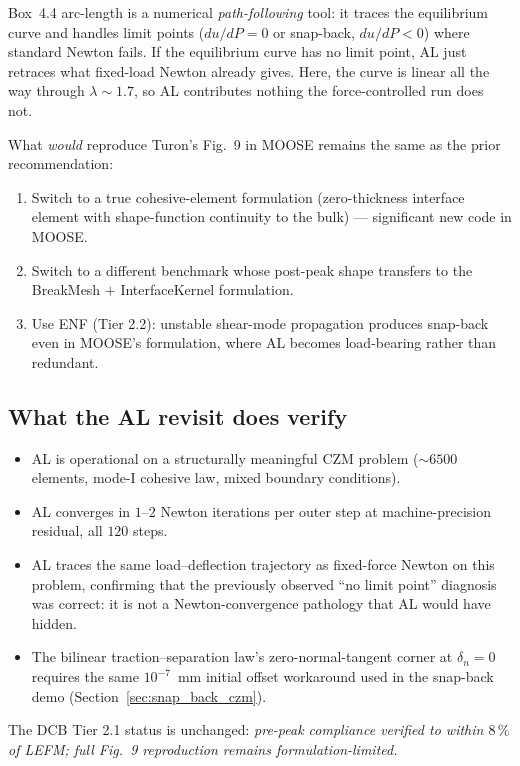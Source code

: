 Box~4.4 arc-length is a numerical \emph{path-following} tool: it traces
the equilibrium curve and handles limit points ($du/dP = 0$ or
snap-back, $du/dP < 0$) where standard Newton fails. If the equilibrium
curve has no limit point, AL just retraces what fixed-load Newton already
gives. Here, the curve is linear all the way through $\lambda \sim 1.7$,
so AL contributes nothing the force-controlled run does not.

What \emph{would} reproduce Turon's Fig.~9 in MOOSE remains the same as
the prior recommendation:
\begin{enumerate}
\item Switch to a true cohesive-element formulation (zero-thickness
      interface element with shape-function continuity to the bulk) —
      significant new code in MOOSE.
\item Switch to a different benchmark whose post-peak shape transfers
      to the BreakMesh $+$ InterfaceKernel formulation.
\item Use ENF (Tier 2.2): unstable shear-mode propagation produces
      snap-back even in MOOSE's formulation, where AL becomes
      load-bearing rather than redundant.
\end{enumerate}

\subsection{What the AL revisit does verify}

\begin{itemize}
\item AL is operational on a structurally meaningful CZM problem
      ($\sim 6500$ elements, mode-I cohesive law, mixed boundary
      conditions).
\item AL converges in $1$--$2$ Newton iterations per outer step at
      machine-precision residual, all $120$ steps.
\item AL traces the same load--deflection trajectory as fixed-force
      Newton on this problem, confirming that the previously observed
      ``no limit point'' diagnosis was correct: it is not a
      Newton-convergence pathology that AL would have hidden.
\item The bilinear traction--separation law's zero-normal-tangent corner
      at $\delta_n = 0$ requires the same $10^{-7}$~mm initial offset
      workaround used in the snap-back demo
      (Section~\ref{sec:snap_back_czm}).
\end{itemize}

The DCB Tier 2.1 status is unchanged: \emph{pre-peak compliance verified
to within $8\,\%$ of LEFM; full Fig.~9 reproduction remains formulation-limited.}

